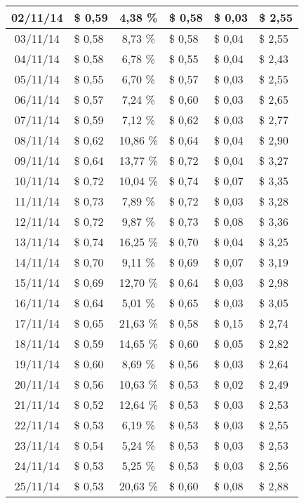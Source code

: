 \begin{center}
\begin{small}
\begin{longtable}{|c|l|c|l|l|l|}
02/11/14 & \$ 0,59 & 4,38 \% & \$ 0,58 & \$ 0,03 & \$ 2,55 \\ \hline
03/11/14 & \$ 0,58 & 8,73 \% & \$ 0,58 & \$ 0,04 & \$ 2,55 \\ \hline
04/11/14 & \$ 0,58 & 6,78 \% & \$ 0,55 & \$ 0,04 & \$ 2,43 \\ \hline
05/11/14 & \$ 0,55 & 6,70 \% & \$ 0,57 & \$ 0,03 & \$ 2,55 \\ \hline
06/11/14 & \$ 0,57 & 7,24 \% & \$ 0,60 & \$ 0,03 & \$ 2,65 \\ \hline
07/11/14 & \$ 0,59 & 7,12 \% & \$ 0,62 & \$ 0,03 & \$ 2,77 \\ \hline
08/11/14 & \$ 0,62 & 10,86 \% & \$ 0,64 & \$ 0,04 & \$ 2,90 \\ \hline
09/11/14 & \$ 0,64 & 13,77 \% & \$ 0,72 & \$ 0,04 & \$ 3,27 \\ \hline
10/11/14 & \$ 0,72 & 10,04 \% & \$ 0,74 & \$ 0,07 & \$ 3,35 \\ \hline
11/11/14 & \$ 0,73 & 7,89 \% & \$ 0,72 & \$ 0,03 & \$ 3,28 \\ \hline
12/11/14 & \$ 0,72 & 9,87 \% & \$ 0,73 & \$ 0,08 & \$ 3,36 \\ \hline
13/11/14 & \$ 0,74 & 16,25 \% & \$ 0,70 & \$ 0,04 & \$ 3,25 \\ \hline
14/11/14 & \$ 0,70 & 9,11 \% & \$ 0,69 & \$ 0,07 & \$ 3,19 \\ \hline
15/11/14 & \$ 0,69 & 12,70 \% & \$ 0,64 & \$ 0,03 & \$ 2,98 \\ \hline
16/11/14 & \$ 0,64 & 5,01 \% & \$ 0,65 & \$ 0,03 & \$ 3,05 \\ \hline
17/11/14 & \$ 0,65 & 21,63 \% & \$ 0,58 & \$ 0,15 & \$ 2,74 \\ \hline
18/11/14 & \$ 0,59 & 14,65 \% & \$ 0,60 & \$ 0,05 & \$ 2,82 \\ \hline
19/11/14 & \$ 0,60 & 8,69 \% & \$ 0,56 & \$ 0,03 & \$ 2,64 \\ \hline
20/11/14 & \$ 0,56 & 10,63 \% & \$ 0,53 & \$ 0,02 & \$ 2,49 \\ \hline
21/11/14 & \$ 0,52 & 12,64 \% & \$ 0,53 & \$ 0,03 & \$ 2,53 \\ \hline
22/11/14 & \$ 0,53 & 6,19 \% & \$ 0,53 & \$ 0,03 & \$ 2,55 \\ \hline
23/11/14 & \$ 0,54 & 5,24 \% & \$ 0,53 & \$ 0,03 & \$ 2,53 \\ \hline
24/11/14 & \$ 0,53 & 5,25 \% & \$ 0,53 & \$ 0,03 & \$ 2,56 \\ \hline
25/11/14 & \$ 0,53 & 20,63 \% & \$ 0,60 & \$ 0,08 & \$ 2,88 \\ \hline

\end{longtable}
\end{small}
\end{center}
